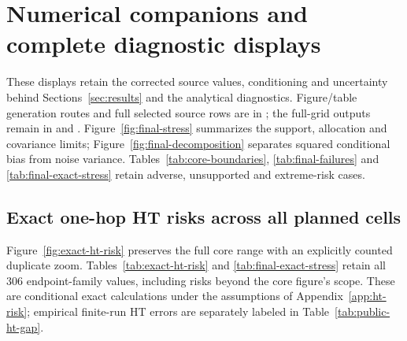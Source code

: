 \clearpage
\section{Numerical companions and complete diagnostic displays}
\label{app:numerical}
These displays retain the corrected source values, conditioning and uncertainty behind Sections~\ref{sec:results} and the analytical diagnostics. Figure/table generation routes and full selected source rows are in ; the full-grid outputs remain in  and . Figure~\ref{fig:final-stress} summarizes the support, allocation and covariance limits; Figure~\ref{fig:final-decomposition} separates squared conditional bias from noise variance. Tables~\ref{tab:core-boundaries}, \ref{tab:final-failures} and \ref{tab:final-exact-stress} retain adverse, unsupported and extreme-risk cases.

\clearpage

\clearpage

\clearpage

\clearpage

\clearpage

\clearpage

\clearpage

\clearpage

\clearpage

\clearpage

\clearpage

\clearpage

\clearpage

\clearpage

\clearpage

\clearpage

\clearpage

\clearpage
\subsection{Exact one-hop HT risks across all planned cells}
Figure~\ref{fig:exact-ht-risk} preserves the full core range with an explicitly counted duplicate zoom. Tables~\ref{tab:exact-ht-risk} and \ref{tab:final-exact-stress} retain all 306 endpoint-family values, including risks beyond the core figure's scope. These are conditional exact calculations under the assumptions of Appendix~\ref{app:ht-risk}; empirical finite-run HT errors are separately labeled in Table~\ref{tab:public-ht-gap}.

\clearpage

\clearpage

\clearpage
